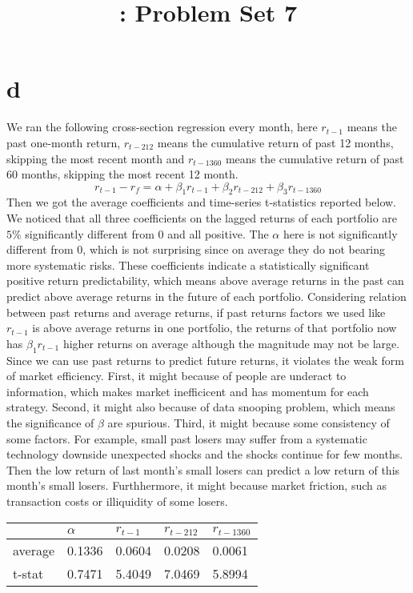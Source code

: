 \documentclass{report}
\title{\LectureTitle: Problem Set 7}
\begin{document}
\maketitle
\newpage

\section{d}

We ran the following cross-section regression every month, here $r_{t-1}$ means the past one-month return, $r_{t-212}$ means the cumulative return of past 12 months, skipping the most recent month and  $r_{t-1360}$ means the cumulative return of past 60 months, skipping the most recent 12 month.  
\[ r_{t-1}-r_{f} = \alpha + \beta_{1} r_{t-1} + \beta_{2} r_{t-212} + \beta_{3} r_{t-1360} \]
Then we got the average coefficients and time-series t-statistics reported below. We noticed that all three coefficients on the lagged returns of each portfolio are $5\%$ significantly different from 0 and all positive. The $\alpha$ here is not significantly different from 0, which is not surprising since on average they do not bearing more systematic risks. These coefficients indicate a statistically significant positive return predictability, which means above average returns in the past can predict above average returns in the future of each portfolio. Considering relation between past returns and average returns, if past returns factors we used like $r_{t-1}$ is above average returns in one portfolio, the returns of that portfolio now has $\beta_{1} r_{t-1}$ higher returns on average although the magnitude may not be large. Since we can use past returns to predict future returns, it violates the weak form of market efficiency. First, it might because of people are underact to information, which makes market inefficicent and has momentum for each strategy. Second, it might also because of data snooping problem, which means the significance of $\beta$ are spurious. Third, it might because some consistency of some factors. For example, small past losers may suffer from a systematic technology downside unexpected shocks and the shocks continue for few months. Then the low return of last month's small losers can predict a low return of this month's small losers. Furthhermore, it might because market friction, such as transaction costs or illiquidity of some losers.
\begin{table}[H]
\centering
\begin{tabular}{|l|l|l|l|l|}
\hline
        & $\alpha$  & $r_{t-1}$ & $r_{t-212}$ & $r_{t-1360}$ \\ \hline
average & 0.1336 & 0.0604                & 0.0208               & 0.0061               \\ \hline
t-stat  & 0.7471 & 5.4049                & 7.0469               & 5.8994               \\ \hline
\end{tabular}
\end{table}
\end{document}

